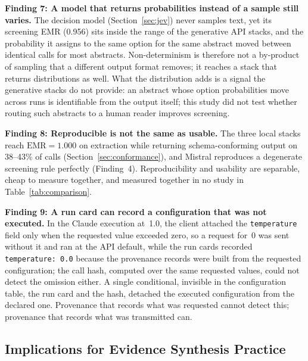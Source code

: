 \documentclass[preprint,review,12pt,authoryear]{elsarticle}
\newcommand{\emr}{\textrm{EMR}}
\begin{document}
\textbf{Finding 7: A model that returns probabilities instead of a sample still varies.}
The decision model (Section~\ref{sec:jev}) never samples text, yet its screening EMR (0.956) sits inside the range of the generative API stacks, and the probability it assigns to the same option for the same abstract moved between identical calls for most abstracts. Non-determinism is therefore not a by-product of sampling that a different output format removes; it reaches a stack that returns distributions as well. What the distribution adds is a signal the generative stacks do not provide: an abstract whose option probabilities move across runs is identifiable from the output itself; this study did not test whether routing such abstracts to a human reader improves screening.

\textbf{Finding 8: Reproducible is not the same as usable.}
The three local stacks reach $\emr{=}1.000$ on extraction while returning schema-conforming output on 38--43\% of calls (Section~\ref{sec:conformance}), and Mistral reproduces a degenerate screening rule perfectly (Finding~4). Reproducibility and usability are separable, cheap to measure together, and measured together in no study in Table~\ref{tab:comparison}.

\textbf{Finding 9: A run card can record a configuration that was not executed.}
In the Claude execution at~1.0, the client attached the \texttt{temperature} field only when the requested value exceeded zero, so a request for~0 was sent without it and ran at the API default, while the run cards recorded \texttt{temperature: 0.0} because the provenance records were built from the requested configuration; the call hash, computed over the same requested values, could not detect the omission either. A single conditional, invisible in the configuration table, the run card and the hash, detached the executed configuration from the declared one. Provenance that records what was requested cannot detect this; provenance that records what was transmitted can.

\subsection{Implications for Evidence Synthesis Practice}
\end{document}

